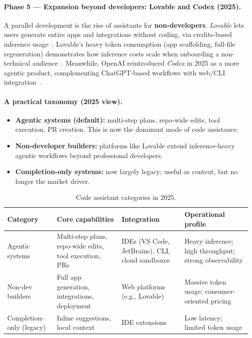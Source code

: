 \documentclass[english]{article}
\begin{document}
\paragraph{Phase 5 — Expansion beyond developers: Lovable and Codex (2025).}
A parallel development is the rise of assistants for \textbf{non-developers}. 
\textit{Lovable} lets users generate entire apps and integrations without coding, via credits-based inference usage~\cite{lovable2025}.
Lovable's heavy token consumption (app scaffolding, full-file regeneration) demonstrates how inference costs scale when onboarding a non-technical audience~\cite{lovable_ft}.
Meanwhile, OpenAI reintroduced \textit{Codex} in 2025 as a more agentic product, complementing ChatGPT-based workflows with web/CLI integration~\cite{openai_codex2025,openai_codex_github}.

\paragraph{A practical taxonomy (2025 view).}
\begin{itemize}
  \item \textbf{Agentic systems (default):} multi-step plans, repo-wide edits, tool execution, PR creation. This is now the dominant mode of code assistance.
  \item \textbf{Non-developer builders:} platforms like Lovable extend inference-heavy agentic workflows beyond professional developers.
  \item \textbf{Completion-only systems:} now largely legacy; useful as context, but no longer the market driver.
\end{itemize}

\begin{table}[H]
\centering
\caption{Code assistant categories in 2025.}
\label{tab:assistant_taxonomy}
\begin{tabular}{|p{3.2cm}|p{5cm}|p{3.8cm}|p{3.2cm}|}
\hline
\textbf{Category} & \textbf{Core capabilities} & \textbf{Integration} & \textbf{Operational profile} \\
\hline
Agentic systems & Multi-step plans, repo-wide edits, tool execution, PRs & IDEs (VS Code, JetBrains), CLI, cloud sandboxes & Heavy inference; high throughput; strong observability \\
\hline
Non-dev builders & Full app generation, integrations, deployment & Web platforms (e.g., Lovable) & Massive token usage; consumer-oriented pricing \\
\hline
Completion-only (legacy) & Inline suggestions, local context & IDE extensions & Low latency; limited token usage \\
\hline
\end{tabular}
\end{table}
\end{document}
